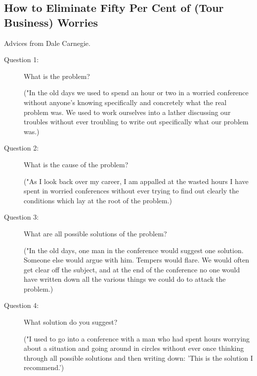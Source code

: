 \subsection{How to Eliminate Fifty Per Cent of (Tour Business) Worries}

	Advices from Dale Carnegie.

	\begin{description}
	\item[Question 1:] What is the problem?

		("In the old days we used to spend an hour or two in a worried
		conference without anyone's knowing
		specifically and concretely what the real problem was. We used to work
		ourselves into a lather
		discussing our troubles without ever troubling to write out specifically
		what our problem was.)

	\item[Question 2:] What is the cause of the problem?

		("As I look back over my career, I am appalled at the wasted hours I
		have spent in worried
		conferences without ever trying to find out clearly the conditions which
		lay at the root of the
		problem.)

	\item[Question 3:] What are all possible solutions of the problem?

		("In the old days, one man in the conference would suggest one solution.
		Someone else would argue
		with him. Tempers would flare. We would often get clear off the subject,
		and at the end of the
		conference no one would have written down all the various things we
		could do to attack the problem.)

	\item[Question 4:] What solution do you suggest?

		("I used to go into a conference with a man who had spent hours worrying
		about a situation and going
		around in circles without ever once thinking through all possible
		solutions and then writing down:
		'This is the solution I recommend.')

	\end{description}

